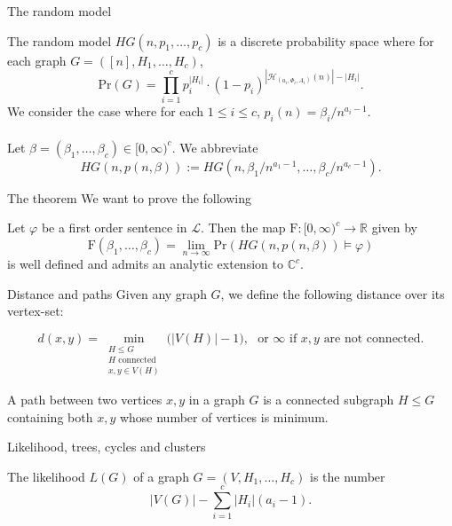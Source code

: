 \documentclass[handout, 11pt]{beamer}
\newcommand{\CC}{\mathbb{C}}
\newcommand{\R}{\mathbb{R}}
\newcommand{\Ln}{\lim\limits_{n\to \infty}}
\begin{document}
	\begin{frame}{The random model}

	The random model $HG(n,p_1,\dots, p_c)$ is a discrete probability space where for each graph 
	$G=([n],H_1,\dots,H_c)$,
	\[ \mathrm{Pr}(G)=\prod_{i=1}^{c} p_i^{|H_i|}\cdot (1-p_i)^{|\mathcal{H}_{(a_i,\Phi_i,A_i)}(n)|-|H_i|} . \]
	We consider the case where for each $1\leq i \leq c$,  $p_i(n)=\beta_i/n^{a_i-1}$.
	\\~\\ 
	Let $\beta=(\beta_1,\dots, \beta_c)\in [0,\infty)^c$. We abbreviate
	\[HG(n,p(n,\beta)):= HG(n,\beta_1/n^{a_1-1},\dots, \beta_c/n^{a_c-1}). \]
	
	\end{frame}
	
	\begin{frame}{The theorem}
		We want to prove the following
		
		\begin{theorem} Let $\varphi$ be a first order sentence in $\mathcal{L}$.
			Then the map $\mathrm{F}:[0,\infty)^c\rightarrow \R$ given by
			\[ \mathrm{F}(\beta_1,\dots, \beta_c)= \Ln 
			\mathrm{Pr}(HG(n,p(n,\beta))\models \varphi )
			\]
			is well defined and admits an analytic extension to $\CC^c$. 
		\end{theorem}
		
	\end{frame}
	
	\begin{frame}{Distance and paths}
		Given any graph $G$, we define the following distance over its vertex-set:
			
			\begin{equation*}d(x,y)= \min_{\substack{H \leq G\\ 
					H \text{ connected }\\
					x,y\in V(H)}} \big(|V(H)| - 1 \big), \, \, \text{ or } \infty \text{ if }
				x,y \text{ are not connected.}
			\end{equation*}
		
		\begin{definition} 
			A path between two vertices $x,y$ in a graph $G$ is
			a connected subgraph $H\leq G$ containing both $x,y$ whose
			number of vertices is minimum. 
		\end{definition}
		
	\end{frame}
	\begin{frame}{Likelihood, trees, cycles and clusters} 
		\begin{definition}
			The likelihood $L(G)$ of a graph $G=(V,H_1,\dots,H_c)$ is
			the number
			\[ |V(G)| - \sum_{i=1}^c |H_i|(a_i-1).\]
		\end{definition}
	~\\
	\end{frame}
\end{document}
